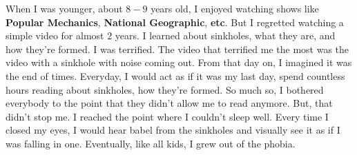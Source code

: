 \setlength\parindent{24pt}

When I was younger, about $8 - 9$ years old, I enjoyed watching shows like
\textbf{Popular Mechanics}, \textbf{National Geographic}, \textbf{etc}. But I
regretted watching a simple video for almost $2$ years. I learned about
sinkholes, what they are, and how they're formed. I was terrified. The video
that terrified me the most was the video with a sinkhole with noise coming out.
From that day on, I imagined it was the end of times. Everyday, I would act as
if it was my last day, spend countless hours reading about sinkholes, how
they're formed. So much so, I bothered everybody to the point that they didn't
allow me to read anymore. But, that didn't stop me. I reached the point where I
couldn't sleep well. Every time I closed my eyes, I would hear babel from the
sinkholes and visually see it as if I was falling in one. Eventually, like all
kids, I grew out of the phobia.
